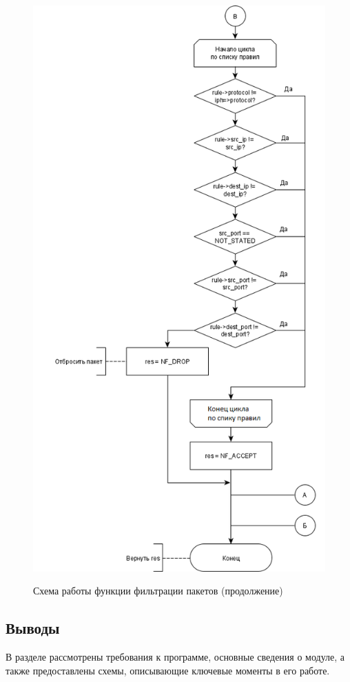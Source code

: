 \begin{figure}[h!]
	\begin{center}
		{\includegraphics[scale = 0.75]{img/filter2.png}}
		\caption{Схема работы функции фильтрации пакетов (продолжение)}
		\label{fig10:image}
	\end{center}
\end{figure}

\pagebreak

\subsection{Выводы}
В разделе рассмотрены требования к программе, основные сведения о модуле, а также предоставлены схемы, описывающие ключевые моменты в его работе.
